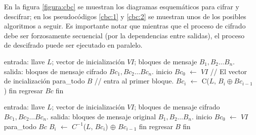 En la figura \ref{figura:cbc} se muestran los diagramas esquemáticos para
cifrar y descifrar; en los pseudocódigos \ref{cbc:1} y \ref{cbc:2} se muestran
unos de los posibles algoritmos a seguir. Es importante notar que mientras que
el proceso de cifrado debe ser forzosamente secuencial (por la dependencias
entre salidas), el proceso de descifrado puede ser ejecutado en paralelo.

\vspace{0.5cm}


\begin{pseudocodigo}[caption={Modo de operación CBC, cifrado.}, label={cbc:1}]
  entrada: llave $ L $; vector de inicialización $ VI $;
           bloques de mensaje $ B_1, B_2 \dots B_n $.
   salida: bloques de mensaje cifrado $ Bc_1, Bc_2 \dots Bc_n $.
  inicio
    $Bc_0$ $\gets$ $ VI $                         // El vector de incialización
    para_todo $B$                 // entra al primer bloque.
      $Bc_i$ $\gets$ C($L$, $B_i \oplus Bc_{i - 1}$)
    fin
    regresar $Bc$
  fin
\end{pseudocodigo}

\begin{pseudocodigo}[caption={Modo de operación CBC, descifrado.}, label={cbc:2}]
  entrada: llave $ L $; vector de inicialización $ VI $;
           bloques de mensaje cifrado $ Bc_1, Bc_2 \dots Bc_n $.
   salida: bloques de mensaje original $ B_1, B_2 \dots B_n $.
  inicio
    $Bc_0$ $\gets$ $ VI $
    para_todo $Bc$
      $B_i$ $\gets$ $C^{-1}$($L$, $Bc_i$) $\oplus$ $Bc_{i-1}$
    fin
    regresar $B$
  fin
\end{pseudocodigo}
